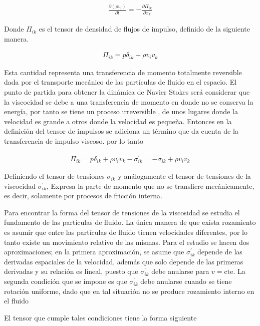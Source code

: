 \begin{eqnarray}
\frac{\partial (\rho v_{i})}{\partial t} = -\frac{\partial \Pi_{ik}}{\partial x_{k}}
\end{eqnarray}

Donde $\Pi_{ik}$ es el tensor de densidad de flujos de impulso, definido de la siguiente manera.

\begin{eqnarray}
\Pi_{ik} = p\delta_{ik} + \rho v_{i}v_{k}
\end{eqnarray}


\noindent Esta cantidad representa una transferencia de momento totalmente reversible dada por el transporte mecánico de las partículas de fluido en el espacio. El punto de partida para obtener la dinámica de Navier Stokes será considerar que la viscocidad se debe a una transferencia de momento en donde no se conserva la energía, por tanto se tiene un proceso irreversible , de unos lugares donde la velocidad es grande a otros donde la velocidad es pequeña. Entonces en la definición del tensor de impulsos se adiciona un término que da cuenta de la transferencia de impulso viscoso. por lo tanto

\begin{eqnarray}
\Pi_{ik} = p\delta_{ik} + \rho v_{i}v_{k} - \sigma^{'}_{ik}=-\sigma_{ik}+\rho v_{i}v_{k}
\end{eqnarray}

\noindent Definiendo el tensor de tensiones $\sigma_{ik} $ y análogamente el tensor de tensiones de la viscocidad $\sigma^{'}_{ik}$, Expresa la parte de momento que no se transfiere mecánicamente, es decir, solamente por procesos de fricción interna.

\noindent Para encontrar la forma del tensor de tensiones de la viscosidad se estudia el fundamento de las partículas de fluido. La única manera de que exista rozamiento es asumir que entre las partículas de fluido tienen velocidades diferentes, por lo tanto existe un movimiento relativo de las mismas. Para el estudio se hacen dos aproximaciones; en la primera aproximación, se asume que $\sigma^{'}_{ik}$ depende de las derivadas espaciales de la velocidad, además que solo depende de las primeras derivadas y su relación es lineal, puesto que $\sigma^{'}_{ik}$ debe anularse para $v = \text{cte}$. La segunda condición que se impone es que $\sigma^{'}_{ik}$ debe anularse cuando se tiene rotación uniforme, dado que en tal situación no se produce rozamiento interno en el fluido

\noindent El tensor que cumple tales condiciones tiene la forma siguiente

